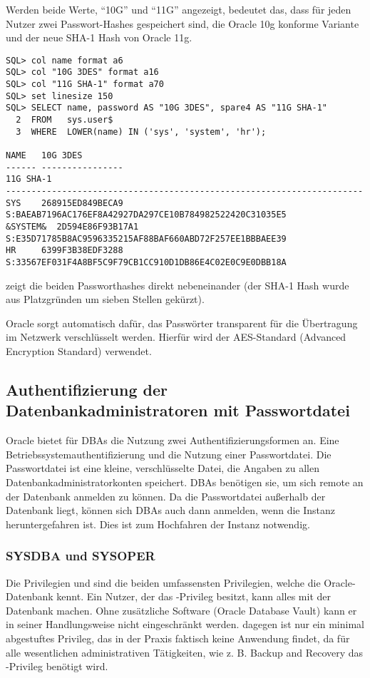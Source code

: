         Werden beide Werte, \enquote{10G} und \enquote{11G} angezeigt, bedeutet das, dass für jeden Nutzer zwei Passwort-Hashes gespeichert sind, die Oracle 10g konforme Variante und der neue SHA-1 Hash von Oracle 11g.
        \begin{lstlisting}[caption={Einblicke in das Data Dictionary -
        Passwordhashes},label=admin208,language=oracle_sql,alsolanguage=sqlplus]
SQL> col name format a6
SQL> col "10G 3DES" format a16
SQL> col "11G SHA-1" format a70
SQL> set linesize 150
SQL> SELECT name, password AS "10G 3DES", spare4 AS "11G SHA-1"
  2  FROM   sys.user$
  3  WHERE  LOWER(name) IN ('sys', 'system', 'hr');

NAME   10G 3DES
------ ----------------
11G SHA-1
----------------------------------------------------------------------
SYS    268915ED849BECA9 S:BAEAB7196AC176EF8A42927DA297CE10B784982522420C31035E5
&SYSTEM&  2D594E86F93B17A1 S:E35D71785B8AC9596335215AF88BAF660ABD72F257EE1BBBAEE39
HR     6399F3B38EDF3288 S:33567EF031F4A8BF5C9F79CB1CC910D1DB86E4C02E0C9E0DBB18A
        \end{lstlisting}
         zeigt die beiden Passworthashes direkt nebeneinander (der SHA-1 Hash wurde aus Platzgründen um sieben Stellen gekürzt).
        \begin{merke}
          Oracle sorgt automatisch dafür, das Passwörter transparent für die Übertragung im Netzwerk verschlüsselt werden. Hierfür wird der AES-Standard (Advanced Encryption Standard) verwendet.
        \end{merke}
      \subsection{Authentifizierung der Datenbankadministratoren mit Passwortdatei}
        Oracle bietet für DBAs die Nutzung zwei Authentifizierungsformen an.
        Eine Betriebssystemauthentifizierung und die Nutzung einer Passwortdatei.
        Die Passwortdatei ist eine kleine, verschlüsselte Datei, die Angaben
        zu allen Datenbankadministratorkonten speichert. DBAs benötigen sie, um
        sich remote an der Datenbank anmelden zu können. Da die Passwortdatei
        außerhalb der Datenbank liegt, können sich DBAs auch dann
        anmelden, wenn die Instanz heruntergefahren ist. Dies ist zum
        Hochfahren der Instanz notwendig.
        \subsubsection{SYSDBA und SYSOPER}
          Die Privilegien  und  sind die
          beiden umfassensten Privilegien, welche die Oracle-Datenbank kennt.
          Ein Nutzer, der das -Privileg besitzt, kann alles mit
          der Datenbank machen. Ohne zusätzliche Software (Oracle Database
          Vault) kann er in seiner Handlungsweise nicht eingeschränkt werden.
           dagegen ist nur ein minimal abgestuftes Privileg,
          das in der Praxis faktisch keine Anwendung findet, da für alle
          wesentlichen administrativen Tätigkeiten, wie z. B. Backup and
          Recovery das -Privileg benötigt wird.

